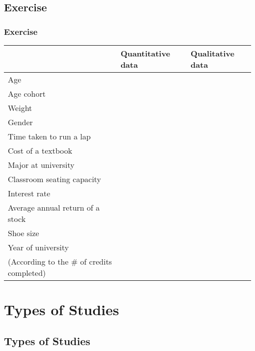 \documentclass[xcolor=svgnames, compress]{beamer}
\begin{document}
\subsection*{Exercise}

\begin{frame}
\frametitle{Exercise}

\vspace{-1cm}

\small
\begin{center}
\begin{tabular}{| p{6.5cm} | p{1.75cm} | p{1.75cm} |}
\hline
 			& Quantitative data 	& Qualitative data 	\\
\hline			
Age			&				&				\\
\hline
Age cohort	&				&				\\
\hline
Weight		&				&				\\
\hline
Gender		&				&				\\
\hline
Time taken to run a lap	&		&				\\
\hline
Cost of a textbook		&		&				\\
\hline
Major at university		&		&				\\
\hline
Classroom seating capacity	&	&				\\
\hline
Interest rate				&	&				\\
\hline
Average annual return of a stock	&	&			\\
\hline
Shoe size		&				&				\\
\hline
Year of university	&			&				\\
(According to the \# of credits completed)	& & 				\\
\hline
\end{tabular}
\end{center}

\vfill

\end{frame}

\normalsize





\section{Types of Studies}
\subsection*{Types of Studies}
\end{document}
